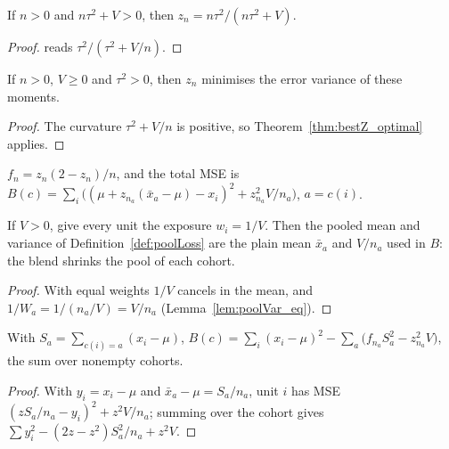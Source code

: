 \begin{lemma}[$z_n = n\tau^2/(n\tau^2 + V)$]\label{lem:sizeZ_eq}
  \leanok
  If $n > 0$ and $n\tau^2 + V > 0$, then $z_n = n\tau^2/(n\tau^2 + V)$.
\end{lemma}
\begin{proof}
  \leanok
   reads $\tau^2/(\tau^2 + V/n)$.
\end{proof}

\begin{theorem}\label{thm:sizeZ_optimal}
  \leanok
  If $n > 0$, $V \ge 0$ and $\tau^2 > 0$, then $z_n$ minimises the error
  variance  of these moments.
\end{theorem}
\begin{proof}
  \leanok
  The curvature $\tau^2 + V/n$ is positive, so
  Theorem~\ref{thm:bestZ_optimal} applies.
\end{proof}

\begin{definition}\label{def:blendLoss}
  \leanok
  $f_n = z_n(2 - z_n)/n$, and the total MSE is
  $B(c) = \sum_i \bigl((\mu + z_{n_a}(\bar x_a - \mu) - x_i)^2 + z_{n_a}^2 V/n_a\bigr)$,
  $a = c(i)$.
\end{definition}

\begin{lemma}\label{lem:blend_pool_eq}
  \leanok
  If $V > 0$, give every unit the exposure $w_i = 1/V$. Then the pooled mean
  and variance of Definition~\ref{def:poolLoss} are the plain mean
  $\bar x_a$ and $V/n_a$ used in $B$: the blend shrinks the  pool
  of each cohort.
\end{lemma}
\begin{proof}
  \leanok
  With equal weights $1/V$ cancels in the mean, and
  $1/W_a = 1/(n_a/V) = V/n_a$ (Lemma~\ref{lem:poolVar_eq}).
\end{proof}

\begin{lemma}\label{lem:blendLoss_eq}
  \leanok
  With $S_a = \sum_{c(i)=a}(x_i - \mu)$,
  $B(c) = \sum_i (x_i - \mu)^2 - \sum_a \bigl(f_{n_a} S_a^2 - z_{n_a}^2 V\bigr)$,
  the sum over nonempty cohorts.
\end{lemma}
\begin{proof}
  \leanok
  With $y_i = x_i - \mu$ and $\bar x_a - \mu = S_a/n_a$, unit $i$ has MSE
  $(z S_a/n_a - y_i)^2 + z^2V/n_a$; summing over the cohort gives
  $\sum y_i^2 - (2z - z^2) S_a^2/n_a + z^2 V$.
\end{proof}

